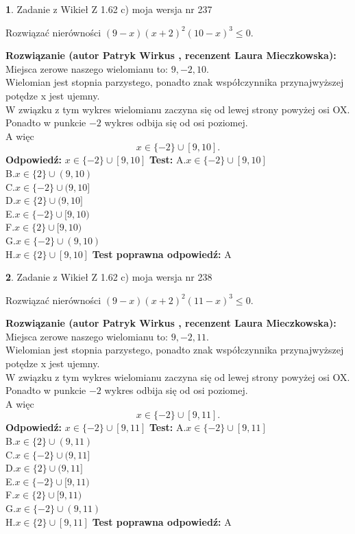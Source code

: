 \documentclass[12pt, a4paper]{article}
\theoremstyle{definition} %
\newtheorem{zad}{}
\newcommand{\zadStart}[1]{\begin{zad}#1\newline}
\newcommand{\zadStop}{\end{zad}}
\newcommand{\rozwStart}[2]{\noindent \textbf{Rozwiązanie (autor #1 , recenzent #2): }\newline}
\newcommand{\rozwStop}{\newline}
\newcommand{\odpStart}{\noindent \textbf{Odpowiedź:}\newline}
\newcommand{\odpStop}{\newline}
\newcommand{\testStart}{\noindent \textbf{Test:}\newline}
\newcommand{\testStop}{\newline}
\newcommand{\kluczStart}{\noindent \textbf{Test poprawna odpowiedź:}\newline}
\newcommand{\kluczStop}{\newline}
\begin{document}
\zadStart{Zadanie z Wikieł Z 1.62 c) moja wersja nr 237}

Rozwiązać nierówności $(9-x)(x+2)^{2}(10-x)^{3}\le0$.
\zadStop
\rozwStart{Patryk Wirkus}{Laura Mieczkowska}
Miejsca zerowe naszego wielomianu to: $9, -2, 10$.\\
Wielomian jest stopnia parzystego, ponadto znak współczynnika przy\linebreak najwyższej potędze x jest ujemny.\\ W związku z tym wykres wielomianu zaczyna się od lewej strony powyżej osi OX.\\
Ponadto w punkcie $-2$ wykres odbija się od osi poziomej.\\
A więc $$x \in \{-2\} \cup [9,10].$$
\rozwStop
\odpStart
$x \in \{-2\} \cup [9,10]$
\odpStop
\testStart
A.$x \in \{-2\} \cup [9,10]$\\
B.$x \in \{2\} \cup (9,10)$\\
C.$x \in \{-2\} \cup (9,10]$\\
D.$x \in \{2\} \cup (9,10]$\\
E.$x \in \{-2\} \cup [9,10)$\\
F.$x \in \{2\} \cup [9,10)$\\
G.$x \in \{-2\} \cup (9,10)$\\
H.$x \in \{2\} \cup [9,10]$
\testStop
\kluczStart
A
\kluczStop



\zadStart{Zadanie z Wikieł Z 1.62 c) moja wersja nr 238}

Rozwiązać nierówności $(9-x)(x+2)^{2}(11-x)^{3}\le0$.
\zadStop
\rozwStart{Patryk Wirkus}{Laura Mieczkowska}
Miejsca zerowe naszego wielomianu to: $9, -2, 11$.\\
Wielomian jest stopnia parzystego, ponadto znak współczynnika przy\linebreak najwyższej potędze x jest ujemny.\\ W związku z tym wykres wielomianu zaczyna się od lewej strony powyżej osi OX.\\
Ponadto w punkcie $-2$ wykres odbija się od osi poziomej.\\
A więc $$x \in \{-2\} \cup [9,11].$$
\rozwStop
\odpStart
$x \in \{-2\} \cup [9,11]$
\odpStop
\testStart
A.$x \in \{-2\} \cup [9,11]$\\
B.$x \in \{2\} \cup (9,11)$\\
C.$x \in \{-2\} \cup (9,11]$\\
D.$x \in \{2\} \cup (9,11]$\\
E.$x \in \{-2\} \cup [9,11)$\\
F.$x \in \{2\} \cup [9,11)$\\
G.$x \in \{-2\} \cup (9,11)$\\
H.$x \in \{2\} \cup [9,11]$
\testStop
\kluczStart
A
\kluczStop
\end{document}
